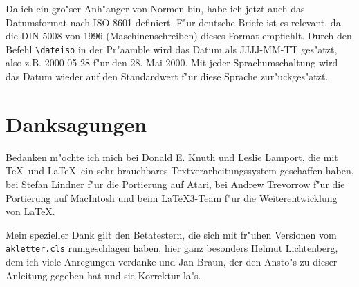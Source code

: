 \documentclass[a4paper]{article}
\begin{document}
Da ich ein gro"ser Anh"anger von Normen bin, habe ich jetzt auch das 
Datumsformat nach ISO 8601 definiert. F"ur deutsche Briefe ist es 
relevant, da die DIN 5008 von 1996 (Maschinenschreiben) dieses Format 
empfiehlt. Durch den Befehl \verb+\dateiso+ in der Pr"aamble wird das 
Datum als JJJJ-MM-TT ges"atzt, also z.B. 2000-05-28 f"ur den 28. Mai 
2000. Mit jeder Sprachumschaltung wird das Datum wieder auf den 
Standardwert f"ur diese Sprache zur"uckges"atzt. 

\section{Danksagungen}

Bedanken m"ochte ich mich bei Donald E. Knuth und Leslie Lamport, 
die mit \TeX\ und \LaTeX\ ein sehr brauchbares 
Textverarbeitungssystem geschaffen haben, bei Stefan Lindner f"ur 
die Portierung auf Atari, bei Andrew Trevorrow f"ur die Portierung 
auf MacIntosh und beim \LaTeX3-Team f"ur die Weiterentwicklung von \LaTeX.

Mein spezieller Dank gilt den Betatestern, die sich mit fr"uhen 
Versionen vom \texttt{akletter.cls} rumgeschlagen haben, hier 
ganz besonders Helmut Lichtenberg, dem ich viele Anregungen 
verdanke und Jan Braun, der den Ansto"s zu dieser Anleitung 
gegeben hat und sie Korrektur la"s.
\end{document}
